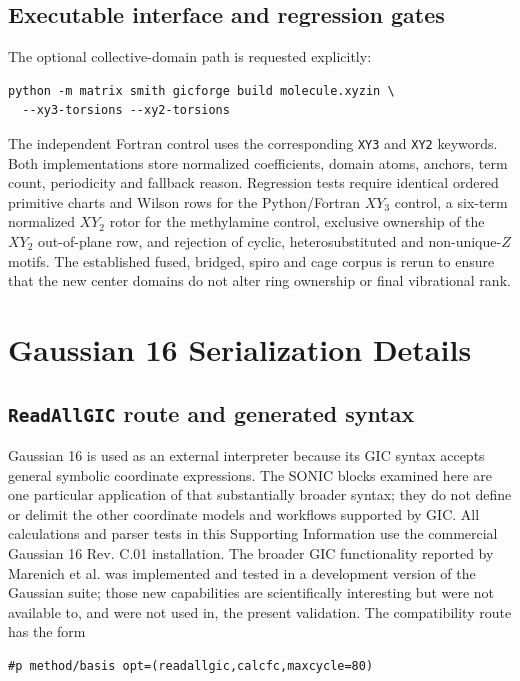\documentclass[10pt]{article}
\begin{document}
{\subsection{Executable interface and regression gates}

The optional collective-domain path is requested explicitly:
\begin{lstlisting}
python -m matrix smith gicforge build molecule.xyzin \
  --xy3-torsions --xy2-torsions
\end{lstlisting}
The independent Fortran control uses the corresponding \texttt{XY3} and
\texttt{XY2} keywords.  Both implementations store normalized coefficients,
domain atoms, anchors, term count, periodicity and fallback reason.  Regression
tests require identical ordered primitive charts and Wilson rows for the
Python/Fortran \(XY_3\) control, a six-term normalized \(XY_2\) rotor for the
methylamine control, exclusive ownership of the \(XY_2\) out-of-plane row,
and rejection of cyclic, heterosubstituted and non-unique-\(Z\) motifs.  The
established fused, bridged, spiro and cage corpus is rerun to ensure that the
new center domains do not alter ring ownership or final vibrational rank.
}

\section{Gaussian 16 Serialization Details}

\subsection{\texttt{ReadAllGIC} route and generated syntax}

Gaussian 16 is used as an external interpreter because its GIC syntax accepts
general symbolic coordinate expressions.  The SONIC blocks examined here are
one particular application of that substantially broader syntax; they do not
define or delimit the other coordinate models and workflows supported by GIC.
All calculations and parser tests in this Supporting Information use the
commercial Gaussian 16 Rev. C.01 installation.  The broader GIC functionality
reported by Marenich et al. was implemented and tested in a development version
of the Gaussian suite; those new capabilities are scientifically interesting
but were not available to, and were not used in, the present validation.
The compatibility route has the form

\begin{lstlisting}
#p method/basis opt=(readallgic,calcfc,maxcycle=80)
\end{lstlisting}
\end{document}
